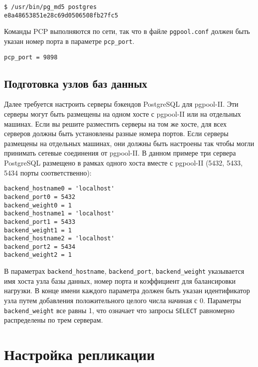 \begin{lstlisting}[label=lst:pgpool8,caption=Настройка команд PCP]
$ /usr/bin/pg_md5 postgres
e8a48653851e28c69d0506508fb27fc5
\end{lstlisting}

Команды PCP выполняются по сети, так что в файле \lstinline!pgpool.conf! должен быть указан номер порта в параметре \lstinline!pcp_port!.

\begin{lstlisting}[label=lst:pgpool9,caption=Настройка команд PCP]
pcp_port = 9898
\end{lstlisting}


\subsection{Подготовка узлов баз данных}

Далее требуется настроить серверы бэкендов PostgreSQL для pgpool-II. Эти серверы могут быть размещены на одном хосте с pgpool-II или на отдельных машинах. Если вы решите разместить серверы на том же хосте, для всех серверов должны быть установлены разные номера портов. Если серверы размещены на отдельных машинах, они должны быть настроены так чтобы могли принимать сетевые соединения от pgpool-II. В данном примере три сервера PostgreSQL размещено в рамках одного хоста вместе с pgpool-II (5432, 5433, 5434 порты соответственно):

\begin{lstlisting}[label=lst:pgpool10,caption=Подготовка узлов баз данных]
backend_hostname0 = 'localhost'
backend_port0 = 5432
backend_weight0 = 1
backend_hostname1 = 'localhost'
backend_port1 = 5433
backend_weight1 = 1
backend_hostname2 = 'localhost'
backend_port2 = 5434
backend_weight2 = 1
\end{lstlisting}

В параметрах \lstinline!backend_hostname!, \lstinline!backend_port!, \lstinline!backend_weight! указывается имя хоста узла базы данных, номер порта и коэффициент для балансировки нагрузки. В конце имени каждого параметра должен быть указан идентификатор узла путем добавления положительного целого числа начиная с 0. Параметры \lstinline!backend_weight! все равны 1, что означает что запросы \lstinline!SELECT! равномерно распределены по трем серверам.




\section{Настройка репликации}
\label{sec:pgpool-II-replica}

